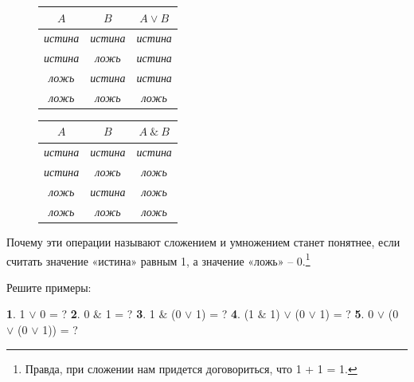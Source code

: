 \begin{figure}[H]
\begin{minipage}{0.45\linewidth}\setlength{\parindent}{1.5em}
    \begin{center}
        \begin{tabular}{ |c|c|c| } 
            \hline
             $A$ & $B$ & $A \vee B$ \\ 
             \hline
             \textit{истина} & \textit{истина} & \textit{истина} \\ 
             \hline
             \textit{истина} & \textit{ложь} & \textit{истина} \\ 
             \hline 
             \textit{ложь} & \textit{истина} & \textit{истина} \\ 
             \hline 
             \textit{ложь} & \textit{ложь} & \textit{ложь} \\ 
             \hline
        \end{tabular}
    \end{center}
\end{minipage}
\hfill
\begin{minipage}{0.45\linewidth}
    \begin{center}
        \begin{tabular}{ |c|c|c| } 
            \hline
             $A$ & $B$ & $A\  \& \ B$ \\ 
             \hline
             \textit{истина} & \textit{истина} & \textit{истина} \\ 
             \hline
             \textit{истина} & \textit{ложь} & \textit{ложь} \\ 
             \hline 
             \textit{ложь} & \textit{истина} & \textit{ложь} \\ 
             \hline 
             \textit{ложь} & \textit{ложь} & \textit{ложь} \\ 
             \hline
        \end{tabular}
    \end{center}
\end{minipage}
\end{figure} 

Почему эти операции называют сложением и умножением станет понятнее, если считать значение «истина» равным 1, а значение «ложь» – 0.\footnote{Правда, при сложении нам придется договориться, что 1 + 1 = 1.}

\begin{ex}
    Решите примеры:
    \par
    \textbf{1}. 1 $\vee$ 0 = ? \hfill 
    \textbf{2}. 0 $\&$ 1 = ? \hfill
    \textbf{3}. 1 $\&$ (0 $\vee$ 1) = ? \hfill
    \textbf{4}. (1 $\&$ 1) $\vee$ (0 $\vee$ 1) = ? \hfill
    \textbf{5}. 0 $\vee$ (0 $\vee$ (0 $\vee$ 1)) = ?
\end{ex}

